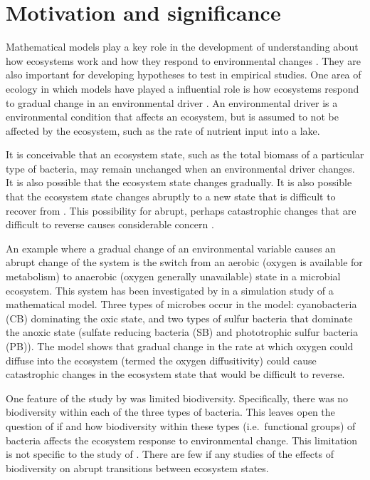 \documentclass[]{elsarticle} %
\begin{document}
\hypertarget{motivation-and-significance}{%
\section{Motivation and
significance}\label{motivation-and-significance}}

Mathematical models play a key role in the development of understanding
about how ecosystems work and how they respond to environmental changes
\citep{Binzer2016a, Chaparro-Pedraza2021, Vasseur2005}. They are also
important for developing hypotheses to test in empirical studies. One
area of ecology in which models have played a influential role is how
ecosystems respond to gradual change in an environmental driver
\citep{Scheffer2001}. An environmental driver is a environmental
condition that affects an ecosystem, but is assumed to not be affected
by the ecosystem, such as the rate of nutrient input into a lake.

It is conceivable that an ecosystem state, such as the total biomass of
a particular type of bacteria, may remain unchanged when an
environmental driver changes. It is also possible that the ecosystem
state changes gradually. It is also possible that the ecosystem state
changes abruptly to a new state that is difficult to recover from
\citep{Scheffer2001}. This possibility for abrupt, perhaps catastrophic
changes that are difficult to reverse causes considerable concern
\citep{Collins2021, Northrop2021, Vandermeer2019}.

An example where a gradual change of an environmental variable causes an
abrupt change of the system is the switch from an aerobic (oxygen is
available for metabolism) to anaerobic (oxygen generally unavailable)
state in a microbial ecosystem. This system has been investigated by
\citet{Bush2017} in a simulation study of a mathematical model. Three
types of microbes occur in the model: cyanobacteria (CB) dominating the
oxic state, and two types of sulfur bacteria that dominate the anoxic
state (sulfate reducing bacteria (SB) and phototrophic sulfur bacteria
(PB)). The model shows that gradual change in the rate at which oxygen
could diffuse into the ecosystem (termed the oxygen diffusitivity) could
cause catastrophic changes in the ecosystem state that would be
difficult to reverse.

One feature of the study by \citet{Bush2017} was limited biodiversity.
Specifically, there was no biodiversity within each of the three types
of bacteria. This leaves open the question of if and how biodiversity
within these types (i.e.~functional groups) of bacteria affects the
ecosystem response to environmental change. This limitation is not
specific to the study of \citet{Bush2017}. There are few if any studies
of the effects of biodiversity on abrupt transitions between ecosystem
states.
\end{document}
